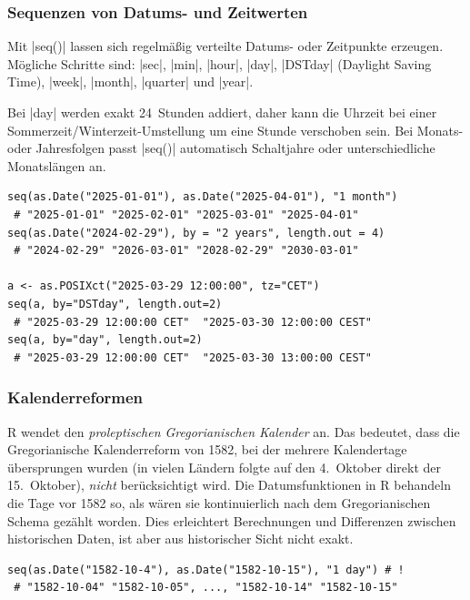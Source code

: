 \documentclass[10pt,twocolumn]{scrartcl}
\renewcommand{\lstinline}{\mycoloredinline}
\begin{document}
\subsubsection{Sequenzen von Datums- und Zeitwerten}

Mit \lstinline|seq()| lassen sich regelmäßig verteilte Datums- oder Zeitpunkte erzeugen. Mögliche Schritte sind: \lstinline|sec|, \lstinline|min|, \lstinline|hour|, \lstinline|day|, \lstinline|DSTday| (Daylight Saving Time), \lstinline|week|, \lstinline|month|, \lstinline|quarter| und \lstinline|year|.

Bei \lstinline|day| werden exakt 24~Stunden addiert, daher kann die Uhrzeit bei einer Sommerzeit/Winterzeit-Umstellung um eine Stunde verschoben sein. Bei Monats- oder Jahresfolgen passt \lstinline|seq()| automatisch Schaltjahre oder unterschiedliche Monatslängen an.

\begin{lstlisting}
seq(as.Date("2025-01-01"), as.Date("2025-04-01"), "1 month")
 # "2025-01-01" "2025-02-01" "2025-03-01" "2025-04-01"
seq(as.Date("2024-02-29"), by = "2 years", length.out = 4)
 # "2024-02-29" "2026-03-01" "2028-02-29" "2030-03-01"

a <- as.POSIXct("2025-03-29 12:00:00", tz="CET")
seq(a, by="DSTday", length.out=2)
 # "2025-03-29 12:00:00 CET"  "2025-03-30 12:00:00 CEST"
seq(a, by="day", length.out=2)
 # "2025-03-29 12:00:00 CET"  "2025-03-30 13:00:00 CEST"
\end{lstlisting}


\subsubsection{Kalenderreformen}

R wendet den \emph{proleptischen Gregorianischen Kalender} an. Das bedeutet, dass die Gregorianische Kalenderreform von 1582, bei der mehrere Kalendertage übersprungen wurden (in vielen Ländern folgte auf den 4.~Oktober direkt der 15.~Oktober), \emph{nicht} berücksichtigt wird. Die Datumsfunktionen in R behandeln die Tage vor 1582 so, als wären sie kontinuierlich nach dem Gregorianischen Schema gezählt worden. Dies erleichtert Berechnungen und Differenzen zwischen historischen Daten, ist aber aus historischer Sicht nicht exakt.

\begin{lstlisting}
seq(as.Date("1582-10-4"), as.Date("1582-10-15"), "1 day") # !
 # "1582-10-04" "1582-10-05", ..., "1582-10-14" "1582-10-15"
\end{lstlisting}
\end{document}
